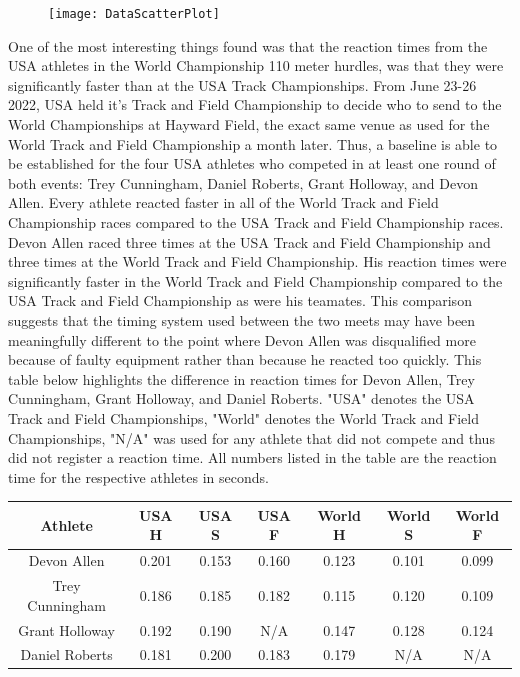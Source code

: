 \documentclass[12pt, letterpaper, titlepage]{article}
\begin{document}
\begin{figure}[h]
  \centering 
  \texttt{[image: DataScatterPlot]}
  \label{fig:DataScatterPlot}
\end{figure}



One of the most interesting things found was that the reaction times from the USA
athletes in the World Championship 110 meter hurdles, was that they were significantly
faster than at the USA Track Championships.  From June 23-26 2022, USA held it's Track
and Field Championship to decide who to send to the World Championships at Hayward 
Field, the exact same venue as used for the World Track and Field Championship a month 
later.  Thus, a baseline is able to be established for the four USA athletes who 
competed in at least one round of both events: Trey Cunningham, Daniel Roberts, 
Grant Holloway, and Devon Allen. Every athlete reacted faster in all of the World 
Track and Field Championship races compared to the USA Track and Field 
Championship races. Devon Allen raced three times at the USA Track and
Field Championship and three times at the World Track and Field  Championship. 
His reaction times were significantly faster in the World Track and
Field Championship compared to the USA Track and Field Championship as were his
teamates.  This comparison suggests that the timing system used between the two
meets may have been meaningfully different to the point where Devon Allen was
disqualified more because of faulty equipment rather than because he reacted
too quickly.  This table below highlights the difference in reaction times for
Devon Allen, Trey Cunningham, Grant Holloway, and Daniel Roberts. "USA" denotes
the USA Track and Field Championships, "World" denotes the World Track and Field
Championships, "N/A" was used for any athlete that did not compete and thus
did not register a reaction time.  All numbers listed in the table are the reaction
time for the respective athletes in seconds. 

\begin{center}
  \begin{tabular}{||c | c c c | c c c||} 
   \hline
   Athlete & USA H & USA S & USA F & World H & World S & World F \\ [0.5ex] 
   \hline\hline
   Devon Allen & 0.201 & 0.153 & 0.160 & 0.123 & 0.101 & 0.099 \\ 
   \hline
   Trey Cunningham & 0.186 & 0.185 & 0.182 & 0.115 & 0.120 & 0.109 \\
   \hline
   Grant Holloway & 0.192 & 0.190 & N/A & 0.147 & 0.128 & 0.124 \\
   \hline
   Daniel Roberts & 0.181 & 0.200 & 0.183 & 0.179 & N/A & N/A \\ [0.5ex]
   \hline
  \end{tabular}
  \end{center}
\end{document}
